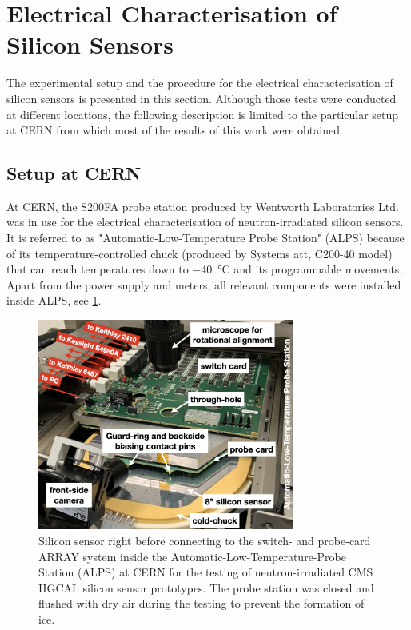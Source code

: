 \section{Electrical Characterisation of Silicon Sensors}
\label{sec:setup}
The experimental setup and the procedure for the electrical characterisation of silicon sensors is presented in this section.
Although those tests were conducted at different locations, the following description is limited to the particular setup at CERN from which most of the results of this work were obtained.

\subsection{Setup at CERN}
\label{subsec:setup_alps}
At CERN, the S200FA probe station produced by Wentworth Laboratories Ltd. was in use for the electrical characterisation of neutron-irradiated silicon sensors. 
It is referred to as "Automatic-Low-Temperature Probe Station" (ALPS) because of its temperature-controlled chuck (produced by Systems att, C200-40 model) that can reach temperatures down to \SI{-40}{\celsius} and its programmable movements.
Apart from the power supply and meters, all relevant components were installed inside ALPS, see \ref{fig:ALPS_setup}.
\begin{figure}[h]
	\centering
	\includegraphics[width=0.75\textwidth]{figures/ALPS_photo_edit.jpeg}
	\caption{
		Silicon sensor right before connecting to the switch- and probe-card ARRAY system inside the Automatic-Low-Temperature-Probe Station (ALPS) at CERN for the testing of neutron-irradiated CMS HGCAL silicon sensor prototypes.
		The probe station was closed and flushed with dry air during the testing to prevent the formation of ice.
		}
		\label{fig:ALPS_setup}
	\end{figure}
